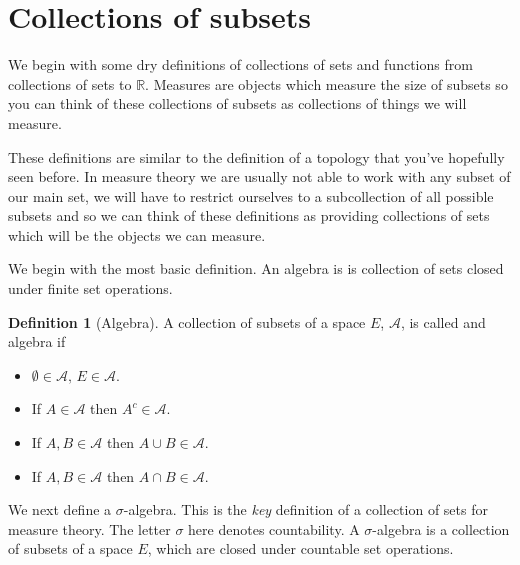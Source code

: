 \documentclass[
]{book}
\providecommand{\tightlist}{%
  \setlength{\itemsep}{0pt}\setlength{\parskip}{0pt}}
\theoremstyle{definition}
\newtheorem{definition}{Definition}[chapter]
\theoremstyle{definition}
\theoremstyle{definition}
\theoremstyle{definition}
\theoremstyle{remark}
\begin{document}
\hypertarget{collections-of-subsets}{%
\section{Collections of subsets}\label{collections-of-subsets}}

We begin with some dry definitions of collections of sets and functions from collections of sets to \(\mathbb{R}\). Measures are objects which measure the size of subsets so you can think of these collections of subsets as collections of things we will measure.

These definitions are similar to the definition of a topology that you've hopefully seen before. In measure theory we are usually not able to work with any subset of our main set, we will have to restrict ourselves to a subcollection of all possible subsets and so we can think of these definitions as providing collections of sets which will be the objects we can measure.

We begin with the most basic definition. An algebra is is collection of sets closed under finite set operations.

\begin{definition}[Algebra]

A collection of subsets of a space \(E\), \(\mathcal{A}\), is called and algebra if

\begin{itemize}
\tightlist
\item
  \(\emptyset \in \mathcal{A}, \, E \in \mathcal{A}\).
\item
  If \(A \in \mathcal{A}\) then \(A^c \in \mathcal{A}\).
\item
  If \(A, B \in \mathcal{A}\) then \(A \cup B \in \mathcal{A}\).
\item
  If \(A, B \in \mathcal{A}\) then \(A \cap B \in \mathcal{A}\).
\end{itemize}

\end{definition}

We next define a \(\sigma\)-algebra. This is the \emph{key} definition of a collection of sets for measure theory. The letter \(\sigma\) here denotes countability. A \(\sigma\)-algebra is a collection of subsets of a space \(E\), which are closed under countable set operations.
\end{document}
